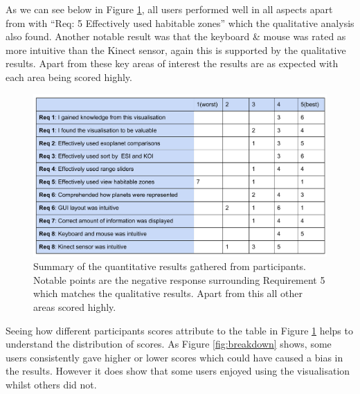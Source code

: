 As we can see below in Figure \ref{fig:summary}, all users performed well in all
aspects apart from with ``Req: 5 Effectively used habitable zones'' which the
qualitative analysis also found. Another notable result was that the keyboard \&
mouse was rated as more intuitive than the Kinect sensor, again this is
supported by the qualitative results. Apart from these key areas of interest the
results are as expected with each area being scored highly. 
\clearpage
\begin{figure}[H]
\centering
      \includegraphics[width=1\textwidth]{images/summaryResults.pdf}
  \caption[Summary of the quantitative results]{Summary of the quantitative
results gathered from participants. Notable points are the negative response
surrounding Requirement 5 which matches the qualitative results. Apart from this
all other areas scored highly.}  
    \label{fig:summary}
    \end{figure}
    
Seeing how different participants scores attribute to the table in Figure
\ref{fig:summary} helps to understand the distribution of scores. As Figure
\ref{fig:breakdown} shows, some users consistently gave higher or lower scores
which could have caused a bias in the results. However it does show that some
users enjoyed using the visualisation whilst others did not. 
\clearpage
    
